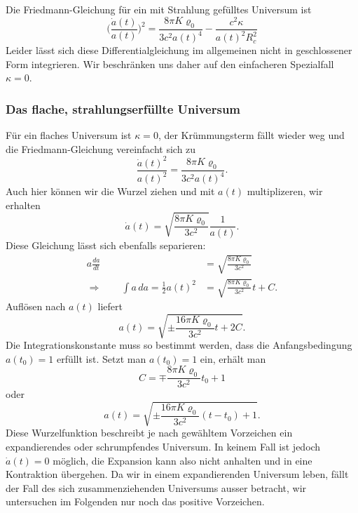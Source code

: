 Die Friedmann-Gleichung für ein mit Strahlung gefülltes Universum ist
\begin{equation}
\biggl(
\frac{\dot a(t)}{a(t)}
\biggr)^2
=
\frac{8\pi K \varrho_0}{3c^2a(t)^4}
-
\frac{c^2\kappa }{a(t)^2R_c^2}
\end{equation}
Leider lässt sich diese Differentialgleichung im allgemeinen
nicht in geschlossener Form integrieren.
Wir beschränken uns daher auf den einfacheren Spezialfall $\kappa=0$.

\subsubsection{Das flache, strahlungserfüllte Universum}
Für ein flaches Universum ist $\kappa=0$, der Krümmungsterm fällt wieder
weg und die Friedmann-Gleichung vereinfacht sich zu
\begin{equation*}
\frac{\dot a(t)^2}{a(t)^2}
=
\frac{8\pi K\varrho_0}{3c^2 a(t)^4}.
\end{equation*}
Auch hier können wir die Wurzel ziehen und mit $a(t)$ multiplizeren,
wir erhalten
\begin{equation*}
\dot a(t)
=
\sqrt{\frac{8\pi K\varrho_0}{3c^2}}\frac1{a(t)}.
\end{equation*}
Diese Gleichung lässt sich ebenfalls separieren:
\begin{align*}
a\frac{da}{dt}
&=
\sqrt{\frac{8\pi K\varrho_0}{3c^2}}
\\
\Rightarrow\qquad
\int a\,da
=
\frac12a(t)^2
&=
\sqrt{\frac{8\pi K\varrho_0}{3c^2}}t + C.
\end{align*}
Auflösen nach $a(t)$ liefert
\[
a(t)
=
\sqrt{\pm\frac{16\pi K\varrho_0}{3c^2}t + 2C}.
\]
Die Integrationskonstante muss so bestimmt werden, dass die
Anfangsbedingung $a(t_0)=1$  erfüllt ist.
Setzt man $a(t_0)=1$ ein, erhält man
\[
C
=
\mp\frac{8\pi K\varrho_0}{3c^2}t_0+1
\]
oder
\begin{equation}
a(t)
= 
\sqrt{\pm\frac{16\pi K\varrho_0}{3c^2}(t-t_0) + 1}.
\label{skript:friedmann:a(t)}
\end{equation}
Diese Wurzelfunktion beschreibt je nach gewähltem Vorzeichen ein
expandierendes oder schrumpfendes Universum.
In keinem Fall ist jedoch $\dot a(t)=0$ möglich, die Expansion kann
also nicht anhalten und in eine Kontraktion übergehen.
Da wir in einem expandierenden Universum leben, fällt der Fall
des sich zusammenziehenden Universums ausser betracht,
wir untersuchen im Folgenden nur noch das positive Vorzeichen.

